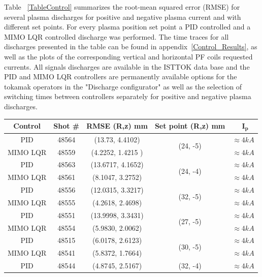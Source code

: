  Table ~\ref{TableControl} summarizes the root-mean squared error (RMSE) for several plasma discharges for positive and negative plasma current and with different set points. For every plasma position set point a PID controlled and a MIMO LQR controlled discharge was performed. The time traces for all discharges presented in the table can be found in appendix~\ref{Control_Results}, as well as the plots of the corresponding vertical and horizontal PF coils requested currents. All signals discharges are available in the ISTTOK data base and the PID and MIMO LQR controllers are permanently available options for the tokamak operators in the "Discharge configurator" as well as the selection of switching times between controllers separately for positive and negative plasma discharges.\smallskip

\clearpage
\begin{center}
	\begin{longtable}{||c| c| c| c|c||} 
		\hline
		\rowcolor{color2}
		\textbf{Control} &  \textbf{Shot \#} &\textbf{RMSE (R,z) mm} & \textbf{ Set point (R,z) mm} &\ $\mathbf{I_p}$ \\ [0.5ex] 
		\hline\hline
		PID & 48564 &  (13.73, 4.4102) & \multirow{ 2}{*}{(24, -5)}&  $\approx 4 kA$ \\ 
		\cline{1-3} \cline{5-5}
		MIMO LQR & 48559 & (4.2252, 1.4215 ) & &  $\approx 4 kA$	\\
		\hline
		PID & 48563 & (13.6717,	4.1652)  & \multirow{ 2}{*}{(24, -4)}& $\approx 4 kA$ \\ 
		\cline{1-3} \cline{5-5}
		MIMO LQR & 48561 & (8.1047,	3.2752) & & $\approx 4 kA$ \\
		\hline
		PID & 48556 & (12.0315,	3.3217)  & \multirow{ 2}{*}{(32, -5)}& $\approx 4 kA$  \\ 
		\cline{1-3} \cline{5-5}
		MIMO LQR & 48555 & (4.2618, 2.4698) &  &  $\approx 4 kA$ \\
		\hline
		PID & 48551 & (13.9998,	3.3431)  & \multirow{ 2}{*}{(27, -5)} &  $\approx 4 kA$ \\ 
		\cline{1-3} \cline{5-5}
		MIMO LQR & 48554 & (5.9830, 2.0062)  &  &  $\approx 4 kA$ \\
		\hline
		PID & 48515 & (6.0178,	2.6123)  & \multirow{ 2}{*}{(30, -5)} & $\approx 4 kA$ \\ 
		\cline{1-3} \cline{5-5}
		MIMO LQR & 48541 & (5.8372,	1.7664) &  &  $\approx 4 kA$\\
		\hline
		PID & 48544 & (4.8745,	2.5167)  & \multirow{ 2}{*}{(32, -4)}& $\approx 4 kA$ \\ 

\end{longtable}
\end{center}
